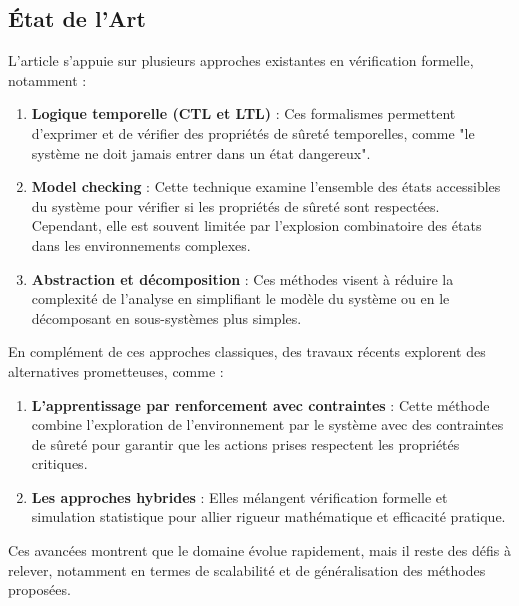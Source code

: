 \documentclass[../CSC_5RO10_TA.tex]{subfiles}
\begin{document}
\subsection{État de l'Art}
\noindent L'article s'appuie sur plusieurs approches existantes en vérification formelle, notamment :
\begin{enumerate}[rightmargin=\leftmargin]
    \item \textbf{Logique temporelle (CTL et LTL)} : Ces formalismes permettent d'exprimer et de vérifier des propriétés de sûreté temporelles, comme "le système ne doit jamais entrer dans un état dangereux".
    \item \textbf{Model checking} : Cette technique examine l'ensemble des états accessibles du système pour vérifier si les propriétés de sûreté sont respectées. Cependant, elle est souvent limitée par l'explosion combinatoire des états dans les environnements complexes.
    \item \textbf{Abstraction et décomposition} : Ces méthodes visent à réduire la complexité de l'analyse en simplifiant le modèle du système ou en le décomposant en sous-systèmes plus simples.
\end{enumerate}
\noindent En complément de ces approches classiques, des travaux récents explorent des alternatives prometteuses, comme :
\begin{enumerate}[rightmargin=\leftmargin]
    \item \textbf{L'apprentissage par renforcement avec contraintes} : Cette méthode combine l'exploration de l'environnement par le système avec des contraintes de sûreté pour garantir que les actions prises respectent les propriétés critiques.
    \item \textbf{Les approches hybrides} : Elles mélangent vérification formelle et simulation statistique pour allier rigueur mathématique et efficacité pratique.
\end{enumerate}
Ces avancées montrent que le domaine évolue rapidement, mais il reste des défis à relever, notamment en termes de scalabilité et de généralisation des méthodes proposées.
\end{document}
